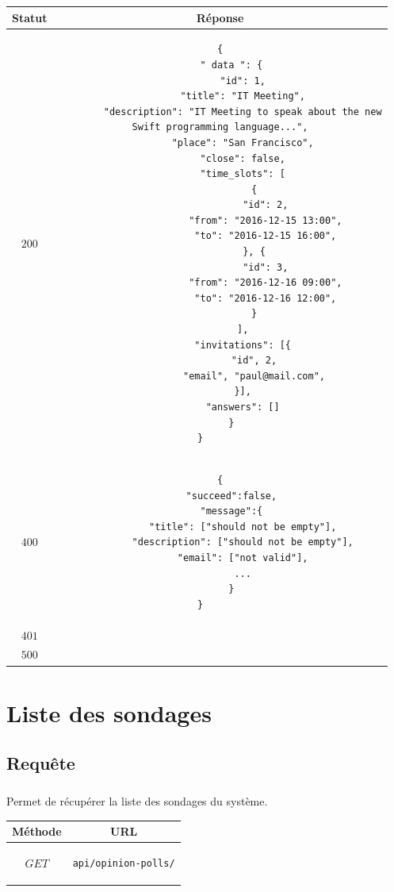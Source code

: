 \documentclass[titlepage]{report}
\begin{document}
\begin{center}
	\begin{tabular}{|c|c|}
		\hline
		Statut & Réponse \\
		\hline
		$ 200 $ & \begin{lstlisting}
{
	" data ": {
		"id": 1,
		"title": "IT Meeting",
		"description": "IT Meeting to speak about the new
Swift programming language...",
		"place": "San Francisco",
		"close": false,
		"time_slots": [
			{
				"id": 2,
				"from": "2016-12-15 13:00",
				"to": "2016-12-15 16:00",
			}, {
				"id": 3,
				"from": "2016-12-16 09:00",
				"to": "2016-12-16 12:00",
			}
		],
		"invitations": [{
			"id", 2,
			"email", "paul@mail.com",
		}],
		"answers": []
	}
}		\end{lstlisting} \\ 
		\hline
		$ 400 $ & \begin{lstlisting}
{
	"succeed":false,
	"message":{
		"title": ["should not be empty"],
		"description": ["should not be empty"],
		"email": ["not valid"],
		...
	}
}		\end{lstlisting} \\
		\hline
		$ 401 $ & \\
		\hline
		$ 500 $ & \\
		\hline
	\end{tabular}
\end{center}


\chapter{Liste des sondages}

\section{Requête}

\paragraph{}Permet de récupérer la liste des sondages du système.

\begin{center}
	\begin{tabular}{|c|c|}
		\hline
		Méthode & URL \\
		\hline
		$ GET $ 
		&
		\begin{lstlisting}
api/opinion-polls/
		\end{lstlisting} 
		\\ \hline
	\end{tabular}
\end{center}
\end{document}
